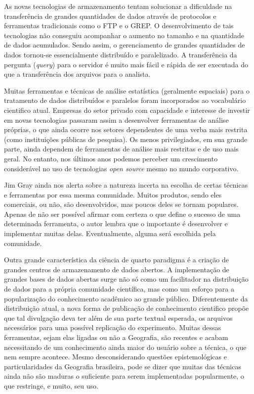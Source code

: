 As novas tecnologias de armazenamento tentam solucionar a dificuldade na transferência de grandes quantidades de dados através de protocolos e ferramentas tradicionais como o FTP e o GREP. O desenvolvimento de tais tecnologias não conseguiu acompanhar o aumento no tamanho e na quantidade de dados acumulados. Sendo assim, o gerenciamento de grandes quantidades de dados tornou-se essencialmente distribuído e paralelizado. A transferência da pergunta (\textit{query}) para o servidor é muito mais fácil e rápida de ser executada do que a transferência dos arquivos para o analista.

Muitas ferramentas e técnicas de análise estatística (geralmente espaciais) para o tratamento de dados distribuídos e paralelos foram incorporados ao vocabulário cientifico atual. Empresas do setor privado com capacidade e interesse de investir em novas tecnologias passaram assim a desenvolver ferramentas de análise próprias, o que ainda ocorre nos setores dependentes de uma verba mais restrita (como instituições públicas de pesquisa). Os menos privilegiados, em sua grande parte, ainda dependem de ferramentas de análise mais restritas e de uso mais geral. No entanto, nos últimos anos podemos perceber um crescimento considerável no uso de tecnologias \textit{open source} mesmo no mundo corporativo. 

Jim Gray ainda nos alerta sobre a natureza incerta na escolha de certas técnicas e ferramentas por essa mesma comunidade. Muitos produtos, sendo eles comerciais, ou não, são desenvolvidos, mas poucos deles se tornam populares. Apenas de não ser possível afirmar com certeza o que define o sucesso de uma determinada ferramenta, o autor lembra que o importante é desenvolver e implementar muitas delas. Eventualmente, alguma será escolhida pela comunidade. 

Outra grande característica da ciência de quarto paradigma é a criação de grandes centros de armazenamento de dados abertos. A implementação de grandes bases de dados abertas surge não só como um facilitador na distribuição de dados para a própria comunidade científica, mas como um esforço para a popularização do conhecimento acadêmico ao grande público. Diferentemente da distribuição atual, a nova forma de publicação de conhecimento cientifico propõe que tal divulgação deva ter além de sua parte textual esperada, os arquivos necessários para uma possível replicação do experimento. Muitas dessas ferramentas, sejam elas ligadas ou não a Geografia, são recentes e acabam necessitando de um conhecimento ainda maior do usuário sobre a técnica, o que nem sempre acontece. Mesmo desconsiderando questões epistemológicas e particularidades da Geografia brasileira, pode se dizer que muitas das técnicas ainda não são maduras o suficiente para serem implementadas popularmente, o que restringe, e muito, seu uso.

